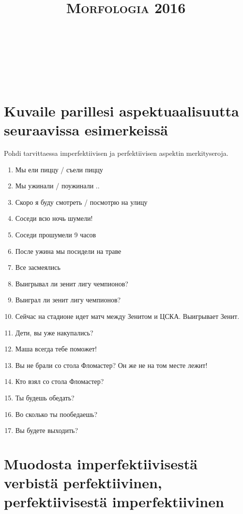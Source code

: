 \documentclass[paper=a4, fontsize=11pt]{scrartcl}
\title{	
\normalfont \normalsize 
\textsc{Morfologia 2016} \\ [25pt] 
\horrule{0.5pt} \\[0.4cm] 
\huge  \\ 
\horrule{2pt} \\[0.5cm] 
}
\date{}
\begin{document}

\onehalfspacing
\section{Kuvaile parillesi aspektuaalisuutta seuraavissa esimerkeissä}

Pohdi tarvittaessa imperfektiivisen ja perfektiivisen aspektin merkityseroja.

\begin{enumerate}
     \item Мы ели пиццу / съели пиццу
     \item Мы ужинали / поужинали ..
     \item Скоро я буду смотреть / посмотрю на улицу
     \item Соседи всю ночь шумели! 
     \item Соседи прошумели 9 часов
     \item После ужина мы посидели на траве 
     \item Все засмеялись
     \item Выигрывал ли зенит лигу чемпионов?
     \item Выиграл ли зенит лигу чемпионов?
     \item Сейчас на стадионе идет матч между Зенитом и ЦСКА. Выигрывает Зенит.
     \item Дети, вы уже накупались?
     \item Маша всегда тебе поможет!
     \item Вы не брали со стола Фломастер? Он же не на том месте лежит!
     \item Кто взял со стола Фломастер?
     \item Ты будешь обедать?
     \item Во сколько ты пообедаешь?
     \item Вы будете выходить?
\end{enumerate}


\section{Muodosta imperfektiivisestä verbistä perfektiivinen, perfektiivisestä imperfektiivinen}
\end{document}
